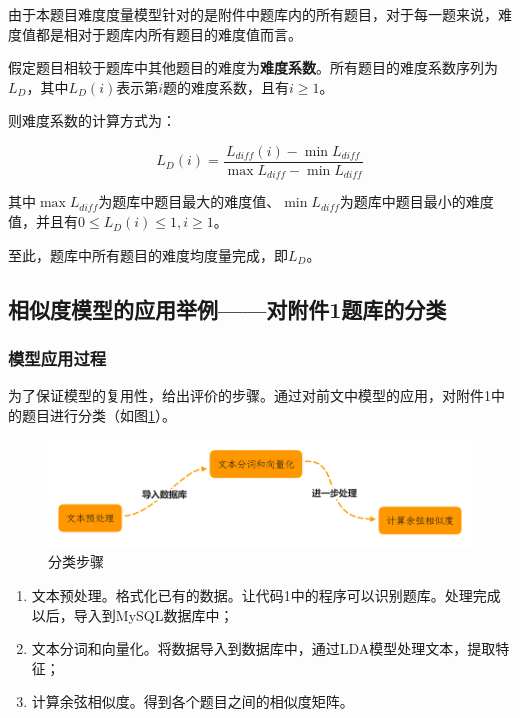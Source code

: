 由于本题目难度度量模型针对的是附件中题库内的所有题目，对于每一题来说，难度值都是相对于题库内所有题目的难度值而言。

假定题目相较于题库中其他题目的难度为\textbf{难度系数}。所有题目的难度系数序列为$L_D$，其中$L_D(i)$表示第$i$题的难度系数，且有$i \geq 1$。

则难度系数的计算方式为：

\begin{equation}
L_D(i) = 
    \frac{
        L_{diff}(i) - \min L_{diff}
    } {
        \max L_{diff} - \min L_{diff}
    }
\end{equation}

其中$\max L_{diff}$为题库中题目最大的难度值、$\min L_{diff}$为题库中题目最小的难度值，并且有$0 \leq L_D(i) \leq 1, i \geq 1$。

至此，题库中所有题目的难度均度量完成，即$L_D$。

\subsection{相似度模型的应用举例——对附件1题库的分类}

\subsubsection{模型应用过程}

为了保证模型的复用性，给出评价的步骤。通过对前文中模型的应用，对附件1中的题目进行分类（如图\ref{figure041640}）。

\begin{figure}[h]
    \centering
    \includegraphics[scale=0.35]{res/figure041640.png}
    \caption{分类步骤}
    \label{figure041640}
\end{figure}

\begin{enumerate}
    \item 文本预处理。格式化已有的数据。让代码1中的程序可以识别题库。处理完成以后，导入到MySQL数据库中；
    \item 文本分词和向量化。将数据导入到数据库中，通过LDA模型处理文本，提取特征；
    \item 计算余弦相似度。得到各个题目之间的相似度矩阵。
\end{enumerate}

